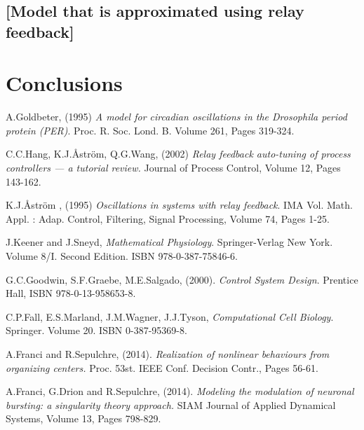 \documentclass[a4paper, 12pt]{article}
\begin{document}
\subsection{[Model that is approximated using relay feedback]}


\section{Conclusions}

\begin{thebibliography}{9}

 A.Goldbeter, (1995) \emph{A model for circadian oscillations in the Drosophila period protein (PER)}. Proc. R. Soc. Lond. B. Volume 261, Pages 319-324. 

 C.C.Hang, K.J.\r{A}str\"{o}m, Q.G.Wang, (2002) \emph{Relay feedback auto-tuning of process controllers --- a tutorial review.} Journal of Process Control, Volume 12, Pages 143-162. 

K.J.\r{A}str\"{o}m , (1995) \emph{Oscillations in systems with relay feedback}. IMA Vol. Math. Appl. : Adap. Control, Filtering, Signal Processing, Volume 74, Pages 1-25. 

J.Keener and J.Sneyd, \emph{Mathematical Physiology}. Springer-Verlag New York. Volume 8/I. Second Edition. ISBN 978-0-387-75846-6. 

G.C.Goodwin, S.F.Graebe, M.E.Salgado, (2000). \emph{Control System Design}. Prentice Hall, ISBN 978-0-13-958653-8.

C.P.Fall, E.S.Marland, J.M.Wagner, J.J.Tyson, \emph{Computational Cell Biology}. Springer. Volume 20. ISBN 0-387-95369-8. 

A.Franci and R.Sepulchre, (2014). \emph{Realization of nonlinear behaviours from organizing centers.} Proc. 53st. IEEE Conf. Decision Contr., Pages 56-61.

A.Franci, G.Drion and R.Sepulchre, (2014). \emph{Modeling the modulation of neuronal bursting: a singularity theory approach.} SIAM Journal of Applied Dynamical Systems, Volume 13, Pages 798-829. 

\end{thebibliography}
\end{document}
